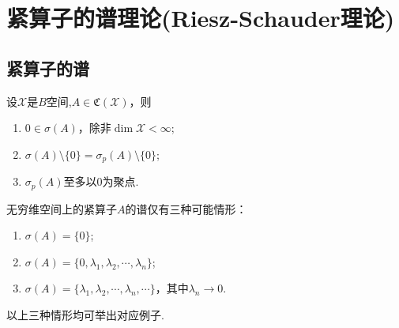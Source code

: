 \documentclass[../../main.tex]{subfiles}%
\begin{document}
\section{紧算子的谱理论(Riesz-Schauder理论)}

\subsection{紧算子的谱}
\begin{theorem}
设$\mathscr{X}$是$B$空间,$A\in\mathfrak{C}(\mathscr{X})$，则
\begin{enumerate}[(1)]
\item $0\in\sigma(A)$，除非$\dim\mathscr{X}<\infty$;
\item $\sigma(A)\setminus\{0\}=\sigma_p(A)\setminus\{0\}$;
\item $\sigma_p(A)$至多以$0$为聚点.
\end{enumerate}
\end{theorem}
\begin{remark}
无穷维空间上的紧算子$A$的谱仅有三种可能情形：
\begin{enumerate}[(1)]
\item $\sigma(A)=\{0\}$;
\item $\sigma(A)=\{0,\lambda_1,\lambda_2,\cdots,\lambda_n\}$;
\item $\sigma(A)=\{\lambda_1,\lambda_2,\cdots,\lambda_n,\cdots\}$，其中$\lambda_n\to0$.
\end{enumerate}
以上三种情形均可举出对应例子.
\end{remark}
\end{document}
